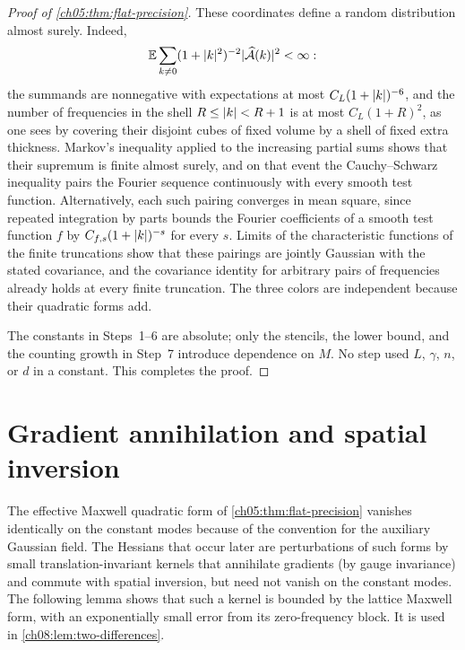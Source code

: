 \begin{proof}[Proof of \cref{ch05:thm:flat-precision}]
These coordinates define a random distribution almost surely. Indeed,
\[
 \mathbb E\sum_{k\ne0}(1+\lvert k\rvert^2)^{-2}\lvert \widehat{\mathcal A}(k)\rvert^2<\infty:
\]
the summands are nonnegative with expectations at most $C_L(1+\lvert k\rvert)^{-6}$, and the number of frequencies in the shell $R\le\lvert k\rvert<R+1$ is at most $C_L(1+R)^2$, as one sees by covering their disjoint cubes of fixed volume by a shell of fixed extra thickness. Markov's inequality applied to the increasing partial sums shows that their supremum is finite almost surely, and on that event the Cauchy--Schwarz inequality pairs the Fourier sequence continuously with every smooth test function. Alternatively, each such pairing converges in mean square, since repeated integration by parts bounds the Fourier coefficients of a smooth test function $f$ by $C_{f,s}(1+\lvert k\rvert)^{-s}$ for every $s$. Limits of the characteristic functions of the finite truncations show that these pairings are jointly Gaussian with the stated covariance, and the covariance identity for arbitrary pairs of frequencies already holds at every finite truncation. The three colors are independent because their quadratic forms add.

The constants in Steps~1--6 are absolute; only the stencils, the lower bound, and the counting growth in Step~7 introduce dependence on $M$. No step used $L$, $\gamma$, $n$, or $d$ in a constant. This completes the proof.
\end{proof}

\section{Gradient annihilation and spatial inversion}\label{ch05:sec:ward}

The effective Maxwell quadratic form of \cref{ch05:thm:flat-precision} vanishes identically on the constant modes because of the convention for the auxiliary Gaussian field. The Hessians that occur later are perturbations of such forms by small translation-invariant kernels that annihilate gradients (by gauge invariance) and commute with spatial inversion, but need not vanish on the constant modes. The following lemma shows that such a kernel is bounded by the lattice Maxwell form, with an exponentially small error from its zero-frequency block. It is used in \cref{ch08:lem:two-differences}.

